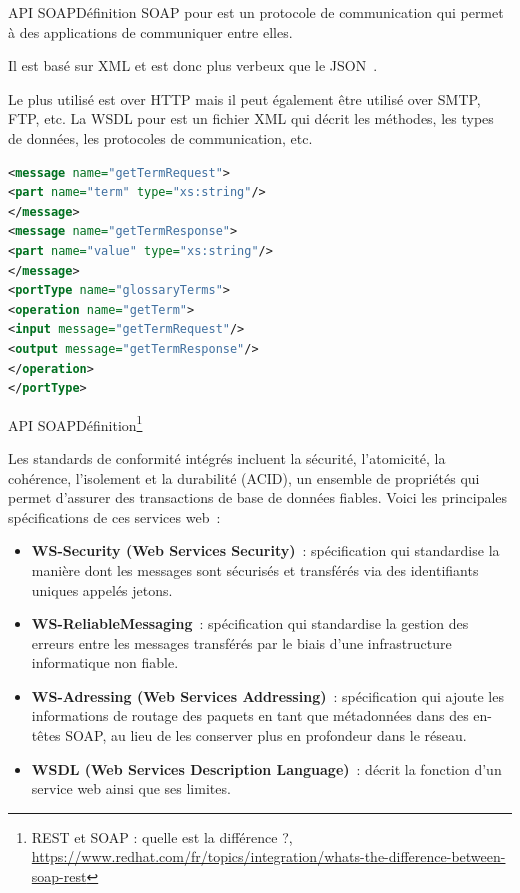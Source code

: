 \documentclass{beamer}
\begin{document}
    \begin{frame}[fragile]{API SOAP}{Définition}
        SOAP pour  est un protocole de communication qui permet à des applications de communiquer entre elles.

        Il est basé sur XML et est donc plus verbeux que le JSON~.

        Le plus utilisé est over HTTP mais il peut également être utilisé over SMTP, FTP, etc.
        \bigbreak
        La WSDL pour  est un fichier XML qui décrit les méthodes, les types de données, les protocoles de communication, etc.
        \begin{lstlisting}[language=xml,basicstyle=\ttfamily\tiny]
<message name="getTermRequest">
<part name="term" type="xs:string"/>
</message>
<message name="getTermResponse">
<part name="value" type="xs:string"/>
</message>
<portType name="glossaryTerms">
<operation name="getTerm">
<input message="getTermRequest"/>
<output message="getTermResponse"/>
</operation>
</portType>
        \end{lstlisting}
    \end{frame}
    \begin{frame}[fragile]{API SOAP}{Définition\footnote{REST et SOAP : quelle est la différence ?, \url{https://www.redhat.com/fr/topics/integration/whats-the-difference-between-soap-rest}}}
        \begin{footnotesize}
            Les standards de conformité intégrés incluent la sécurité, l'atomicité, la cohérence, l'isolement et la durabilité (ACID), un ensemble de propriétés qui permet d'assurer des transactions de base de données fiables.
            Voici les principales spécifications de ces services web~:
            \begin{itemize}
                \item \textbf{WS-Security (Web Services Security)}~: spécification qui standardise la manière dont les messages sont sécurisés et transférés via des identifiants uniques appelés jetons.
                \item \textbf{WS-ReliableMessaging}~: spécification qui standardise la gestion des erreurs entre les messages transférés par le biais d'une infrastructure informatique non fiable.
                \item \textbf{WS-Adressing (Web Services Addressing)}~: spécification qui ajoute les informations de routage des paquets en tant que métadonnées dans des en-têtes SOAP, au lieu de les conserver plus en profondeur dans le réseau.
                \item \textbf{WSDL (Web Services Description Language)}~: décrit la fonction d'un service web ainsi que ses limites.
            \end{itemize}
        \end{footnotesize}
    \end{frame}
\end{document}
